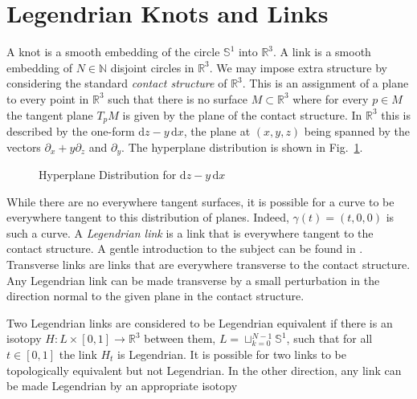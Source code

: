 \documentclass{article}
\theoremstyle{plain}
\begin{document}
    \section{Legendrian Knots and Links}
        A knot is a smooth embedding of the circle $\mathbb{S}^{1}$ into
        $\mathbb{R}^{3}$. A link is a smooth embedding of $N\in\mathbb{N}$
        disjoint circles in $\mathbb{R}^{3}$. We may impose
        extra structure by considering the standard \textit{contact structure}
        of $\mathbb{R}^{3}$. This is an assignment
        of a plane to every point in $\mathbb{R}^{3}$ such that there is no
        surface $M\subset\mathbb{R}^{3}$ where for every $p\in{M}$ the tangent
        plane $T_{p}M$ is given by the plane of the contact structure. In
        $\mathbb{R}^{3}$ this is described by the one-form
        $\textrm{d}z-y\,\textrm{d}x$, the plane at $(x,y,z)$ being spanned by
        the vectors $\partial_{x}+y\partial_{z}$ and $\partial_{y}$. The
        hyperplane distribution is shown in Fig.~\ref{fig:darboux_form_001}.
        \begin{figure}
            \centering
            \caption{Hyperplane Distribution for $\textrm{d}z-y\,\textrm{d}x$}
            \label{fig:darboux_form_001}
        \end{figure}
        While there are no everywhere tangent surfaces, it is possible for a
        curve to be everywhere tangent to this distribution of planes. Indeed,
        $\gamma(t)=(t,0,0)$ is such a curve.
        A \textit{Legendrian link} is a link that is everywhere tangent to
        the contact structure. A gentle introduction to the subject can be found
        in \cite{JoshuaMSabloffWhatIsLegendrianKnot}. Transverse links are links
        that are everywhere transverse to the contact structure. Any Legendrian
        link can be made transverse by a small perturbation in the direction
        normal to the given plane in the contact structure.
        \par\hfill\par
        Two Legendrian links are considered to be Legendrian equivalent if
        there is an isotopy $H:L\times[0,1]\rightarrow\mathbb{R}^{3}$ between
        them, $L=\sqcup_{k=0}^{N-1}\mathbb{S}^{1}$, such that for all
        $t\in[0,1]$ the link $H_{t}$ is Legendrian. It is possible for two links
        to be topologically equivalent but not Legendrian. In the other
        direction, any link can be made Legendrian by an appropriate isotopy
\end{document}
